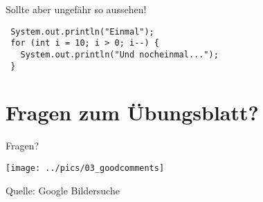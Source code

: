 \documentclass[18pt]{beamer}
\begin{document}
\begin{frame}[fragile]{Sollte aber ungefähr so aussehen!}
 \begin{lstlisting}
 System.out.println("Einmal");
 for (int i = 10; i > 0; i--) {
   System.out.println("Und nocheinmal...");
 }
 \end{lstlisting}
\end{frame}
\section{Fragen zum Übungsblatt?}
\begin{frame}{Fragen?}
\end{frame}



\begin{frame}
 \texttt{[image: ../pics/03\_goodcomments]}
 
 \tiny{Quelle: Google Bildersuche}
\end{frame}
\end{document}
